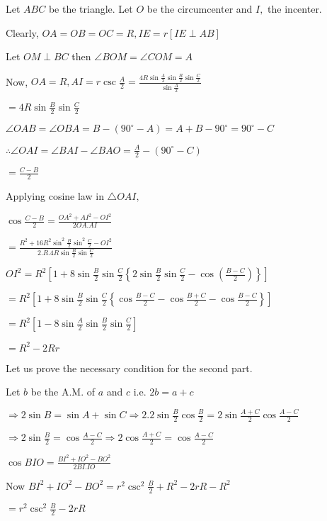   \startplacefigure
    \externalfigure[21_1.pdf]
  \stopplacefigure

  Let $ABC$ be the triangle. Let $O$ be the circumcenter and $I,$ the incenter.

  Clearly, $OA = OB = OC = R, IE=r[IE\perp AB]$

  Let $OM\perp BC$ then $\angle BOM = \angle COM = A$

  Now, $OA = R, AI = r\csc\frac{A}{2} = \frac{4R\sin\frac{A}{2}\sin\frac{B}{2}\sin\frac{C}{2}}{\sin\frac{A}{2}}$

  $= 4R\sin\frac{B}{2}\sin\frac{C}{2}$

  $\angle OAB = \angle OBA = B - (90^\circ - A) = A + B - 90^\circ = 90^\circ - C$

  $\therefore \angle OAI = \angle BAI - \angle BAO = \frac{A}{2} - (90^\circ - C)$

  $= \frac{C - B}{2}$

  Applying cosine law in $\triangle OAI,$

  $\cos\frac{C - B}{2} = \frac{OA^2 + AI^2 - OI^2}{2OA.AI}$

  $= \frac{R^2 + 16R^2\sin^2\frac{B}{2}\sin^2\frac{C}{2} - OI^2}{2.R.4R\sin\frac{B}{2}\sin\frac{C}{2}}$

  $OI^2 = R^2\left[1 + 8\sin\frac{B}{2}\sin\frac{C}{2}\left\{2\sin\frac{B}{2}\sin\frac{C}{2} - \cos\left(\frac{B -
      C}{2}\right)\right\}\right]$

  $= R^2\left[1 + 8\sin\frac{B}{2}\sin\frac{C}{2}\left\{\cos\frac{B - C}{2} - \cos\frac{B + C}{2} - \cos\frac{B -
      C}{2}\right\}\right]$

  $= R^2\left[1 - 8\sin\frac{A}{2}\sin\frac{B}{2}\sin\frac{C}{2}\right]$

  $= R^2 - 2Rr$

  Let us prove the necessary condition for the second part.

  Let $b$ be the A.M. of $a$ and $c$ i.e. $2b = a + c$

  $\Rightarrow 2\sin B = \sin A + \sin C \Rightarrow 2.2\sin\frac{B}{2}\cos\frac{B}{2} = 2\sin\frac{A + C}{2}\cos\frac{A -
    C}{2}$

  $\Rightarrow 2\sin\frac{B}{2} = \cos\frac{A - C}{2} \Rightarrow 2\cos\frac{A + C}{2} = \cos\frac{A - C}{2}$

  $\cos BIO = \frac{BI^2 + IO^2 - BO^2}{2BI.IO}$

  Now $BI^2 + IO^2 - BO^2 = r^2\csc^2\frac{B}{2} + R^2 - 2rR - R^2$

  $= r^2\csc^2\frac{B}{2} - 2rR$

